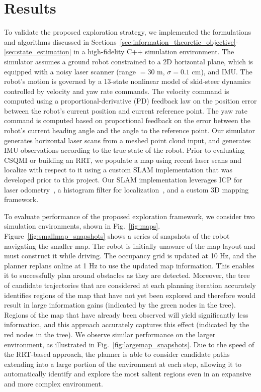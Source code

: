 \section{Results}
\label{sec:results}

To validate the proposed exploration strategy, we implemented the formulations
and algorithms discussed in Sections~\ref{sec:information_theoretic_objective}-\ref{sec:state_estimation}
in a high-fidelity C++ simulation environment. The simulator assumes a ground robot
constrained to a 2D horizontal plane, which is equipped with a noisy laser scanner (range $
= 30$ m, $\sigma = 0.1$ cm), and IMU. The robot's motion is governed by a 13-state nonlinear model of skid-steer dynamics controlled by velocity and yaw rate commands. The velocity command is computed using a proportional-derivative (PD) feedback law on the position error between the robot's current position and current reference point. The yaw rate command is computed based on proportional feedback on the error between the robot's current heading angle and the angle to the reference point. Our simulator generates horizontal laser scans
from a meshed point cloud input, and generates IMU observations according to the true
state of the robot. Prior to evaluating CSQMI or building an RRT, we populate a map using recent laser scans
and localize with respect to it using a custom SLAM implementation that was
developed prior to this project. Our SLAM implementation leverages ICP for laser
odometry~\cite{pomerleau2013comparing}, a histogram filter for
localization~\cite{thrun2005probabilistic}, and a custom 3D mapping framework.


To evaluate performance of the proposed exploration framework, we consider two simulation environments, shown in Fig.~\ref{fig:maps}. Figure~\ref{fig:smallmap_snapshots} shows a series of snapshots of the robot navigating the smaller map. The robot is initially unaware of the map layout and must construct it while driving. The occupancy grid is updated at 10 Hz, and the planner replans online at 1 Hz to use the updated map information. This enables it to successfully plan around obstacles as they are detected. Moreover, the tree of candidate trajectories that are considered at each planning iteration accurately identifies regions of the map that have not yet been explored and therefore would result in large information gains (indicated by the green nodes in the tree). Regions of the map that have already been observed will yield significantly less information, and this approach accurately captures this effect (indicated by the red nodes in the tree). We observe similar performance on the larger environment, as illustrated in Fig.~\ref{fig:largemap_snapshots}. Due to the speed of the RRT-based approach, the planner is able to consider candidate paths extending into a large portion of the environment at each step, allowing it to automatically identify and explore the most salient regions even in an expansive and more complex environment.

